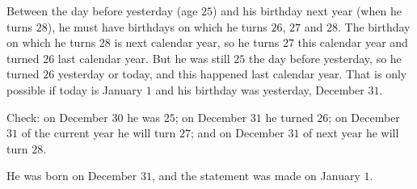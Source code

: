 Between the day before yesterday (age $25$) and his birthday next year (when he turns $28$), he must have birthdays on which he turns $26$, $27$ and $28$. The birthday on which he turns $28$ is next calendar year, so he turns $27$ this calendar year and turned $26$ last calendar year. But he was still $25$ the day before yesterday, so he turned $26$ yesterday or today, and this happened last calendar year. That is only possible if today is January $1$ and his birthday was yesterday, December $31$.

Check: on December $30$ he was $25$; on December $31$ he turned $26$; on December $31$ of the current year he will turn $27$; and on December $31$ of next year he will turn $28$.

He was born on $\boxed{\text{December }31}$, and the statement was made on January $1$.
